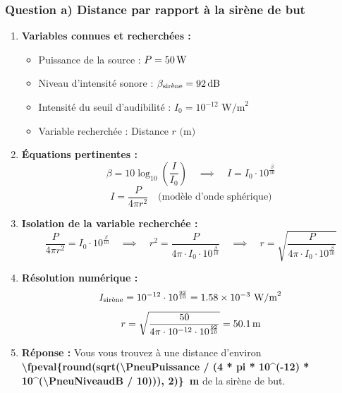 \subsubsection*{Question a) Distance par rapport à la sirène de but}

\begin{enumerate}[label=\arabic*)]
    \item \textbf{Variables connues et recherchées :}
    \begin{itemize}[label= -]
        \item Puissance de la source : $P = \qty{50}{W}$
        \item Niveau d'intensité sonore : $\beta_{\text{sirène}} = \qty{92}{dB}$
        \item Intensité du seuil d'audibilité : $I_0 = 10^{-12} \text{ W/m}^2$
        \item Variable recherchée : Distance $r \text{ (m)}$
    \end{itemize}

    \item \textbf{Équations pertinentes :}
    \[
    \beta = 10 \log_{10}\left(\frac{I}{I_0}\right) \quad \implies \quad I = I_0 \cdot 10^{\frac{\beta}{10}}
    \]
    \[
    I = \frac{P}{4\pi r^2} \quad \text{(modèle d'onde sphérique)}
    \]

    \item \textbf{Isolation de la variable recherchée :}
    \[
    \frac{P}{4\pi r^2} = I_0 \cdot 10^{\frac{\beta}{10}} \quad \implies \quad r^2 = \frac{P}{4\pi \cdot I_0 \cdot 10^{\frac{\beta}{10}}} \quad \implies \quad r = \sqrt{\frac{P}{4\pi \cdot I_0 \cdot 10^{\frac{\beta}{10}}}}
    \]

    \item \textbf{Résolution numérique :}
    \[
    I_{\text{sirène}} = 10^{-12} \cdot 10^{\frac{\PneuNiveaudB}{10}} = \num[scientific-notation=true, round-mode=figures, round-precision=3]{\fpeval{10^(-12) * 10^(\PneuNiveaudB / 10)}} \text{ W/m}^2
    \]
    \[
    r = \sqrt{\frac{\PneuPuissance}{4\pi \cdot 10^{-12} \cdot 10^{\frac{\PneuNiveaudB}{10}}}} = \qty{\fpeval{round(sqrt(\PneuPuissance / (4 * pi * 10^(-12) * 10^(\PneuNiveaudB / 10))), 2)}}{m}
    \]

    \item \textbf{Réponse :}
    Vous vous trouvez à une distance d'environ \textbf{\qty{\fpeval{round(sqrt(\PneuPuissance / (4 * pi * 10^(-12) * 10^(\PneuNiveaudB / 10))), 2)}}{m}} de la sirène de but.
\end{enumerate}


